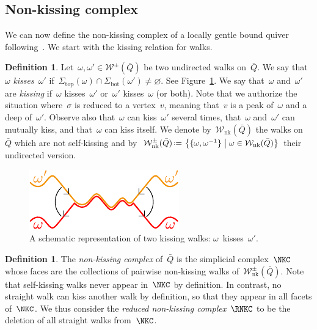 \documentclass{amsart}
\theoremstyle{definition}
\newtheorem{definition}[theorem]{Definition}
\newcommand{\set}[2]{\left\{ #1 \;\middle|\; #2 \right\}} %
\newcommand{\eqdef}{\mbox{\,\raisebox{0.2ex}{\scriptsize\ensuremath{\mathrm:}}\ensuremath{=}\,}} %
\newcommand{\fref}[1]{Figure~\ref{#1}} %
\newcommand{\ie}{\textit{i.e.}~} %
\newcommand{\darkblue}{\color{darkblue}} %
\newcommand{\defn}[1]{\textsl{\darkblue #1}} %
\newcommand{\strings}{\mathcal{S}} %
\newcommand{\walks}{\mathcal{W}} %
\newcommand{\NKWalks}{\mathcal{W}_\mathrm{nk}} %
\renewcommand{\top}{\mathrm{top}} %
\newcommand{\bottom}{\mathrm{bot}} %
\begin{document}
\subsection{Non-kissing complex}

We can now define the non-kissing complex of a locally gentle bound quiver following~\cite{PaluPilaudPlamondon}.
We start with the kissing relation for walks.

\begin{definition}
\label{def:kiss}
Let~$\omega,\omega' \in \walks^\pm(\bar Q)$ be two undirected walks on~$\bar Q$.
We say that~$\omega$ \defn{kisses}~$\omega'$ if~$\Sigma_\top(\omega) \cap \Sigma_\bottom(\omega') \ne \varnothing$.
See \fref{fig:kissing}.
We say that~$\omega$ and~$\omega'$ are \defn{kissing} if~$\omega$ kisses~$\omega'$ or~$\omega'$ kisses~$\omega$ (or both).
Note that we authorize the situation where~$\sigma$ is reduced to a vertex~$v$, meaning that~$v$ is a peak of~$\omega$ and a deep of~$\omega'$.
Observe also that~$\omega$ can kiss~$\omega'$ several times, that~$\omega$ and~$\omega'$ can mutually kiss, and that~$\omega$ can kiss itself.
We denote by~$\NKWalks(\bar Q)$ the walks on~$\bar Q$ which are not self-kissing and by~$\NKWalks^\pm(\bar Q) \eqdef \set{\{\omega, \omega^{-1}\}}{\omega \in \NKWalks(\bar Q)}$ their undirected version.
%
\begin{figure}
	\capstart
	\centerline{\includegraphics[scale=1]{kissing}}
	\caption{A schematic representation of two kissing walks: $\omega$~kisses~$\omega'$.}
	\label{fig:kissing}
\end{figure}
%
\end{definition}

\begin{definition}
\label{def:nKc}
The \defn{non-kissing complex} of~$\bar Q$ is the simplicial complex~$\NKC$ whose faces are the collections of pairwise non-kissing walks of~$\NKWalks^\pm(\bar Q)$.
Note that self-kissing walks never appear in~$\NKC$ by definition.
In contrast, no straight walk can kiss another walk by definition, so that they appear in all facets of~$\NKC$.
We thus consider the \defn{reduced non-kissing complex}~$\RNKC$ to be the deletion of all straight walks from~$\NKC$.
\end{definition}
\end{document}
